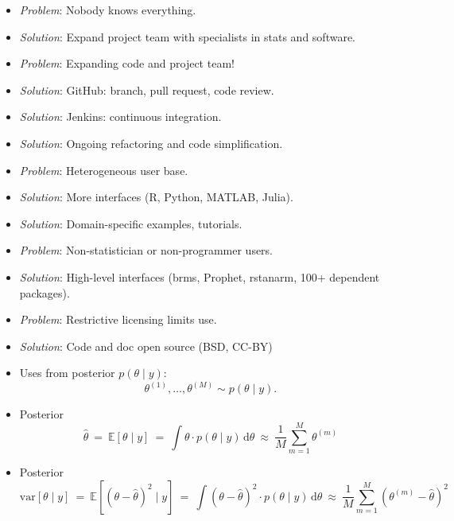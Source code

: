 \documentclass[10pt]{report}
\begin{document}
%
\begin{itemize}
\item {\slshape Problem}:  Nobody knows everything.
\item {\slshape Solution}: Expand project team with specialists in stats and software.
\vspace*{8pt}
\item {\slshape Problem}:  Expanding code and project team!
\item {\slshape Solution}: GitHub: branch, pull
  request, code review.
\item {\slshape Solution}: Jenkins: continuous integration.
\item {\slshape Solution}: Ongoing refactoring and code simplification.
%
\end{itemize}


%
\begin{itemize}
\item {\slshape Problem}:  Heterogeneous user base. 
\item {\slshape Solution}: More interfaces (R, Python, MATLAB, Julia). 
\item {\slshape Solution}:  Domain-specific examples, tutorials.
\vspace*{8pt}
\item {\slshape Problem}:  Non-statistician or non-programmer users.
\item {\slshape Solution}: High-level interfaces (brms, Prophet, rstanarm, 100+ dependent packages).
\vspace*{8pt}
\item {\slshape Problem}:  Restrictive licensing limits use.
\item {\slshape Solution}: Code and doc open source (BSD, CC-BY)
\end{itemize}

%
\begin{itemize}
%
\item Uses  from posterior $p(\theta \mid y)$:
\[
\theta^{(1)}, \ldots, \theta^{(M)} \sim p(\theta \mid y).
\]
\item Posterior 
\[
\hat{\theta}
\ = \
\mathbb{E}[\theta \mid y]
\ = \
\int \theta \cdot p(\theta \mid y) \, \mathrm{d}\theta
\ \approx \
\frac{1}{M} \sum_{m=1}^M \theta^{(m)}
\]
%
\item Posterior 
\[
\mathrm{var}[\theta \mid y]
\ = \
\mathbb{E}[(\theta - \hat{\theta})^2 \mid y]
\ = \
\int (\theta - \hat{\theta})^2 \cdot p(\theta \mid y) \, \mathrm{d}\theta
\ \approx \
\frac{1}{M} \sum_{m=1}^M (\theta^{(m)} - \hat{\theta})^2
\]
\end{itemize}
\end{document}
